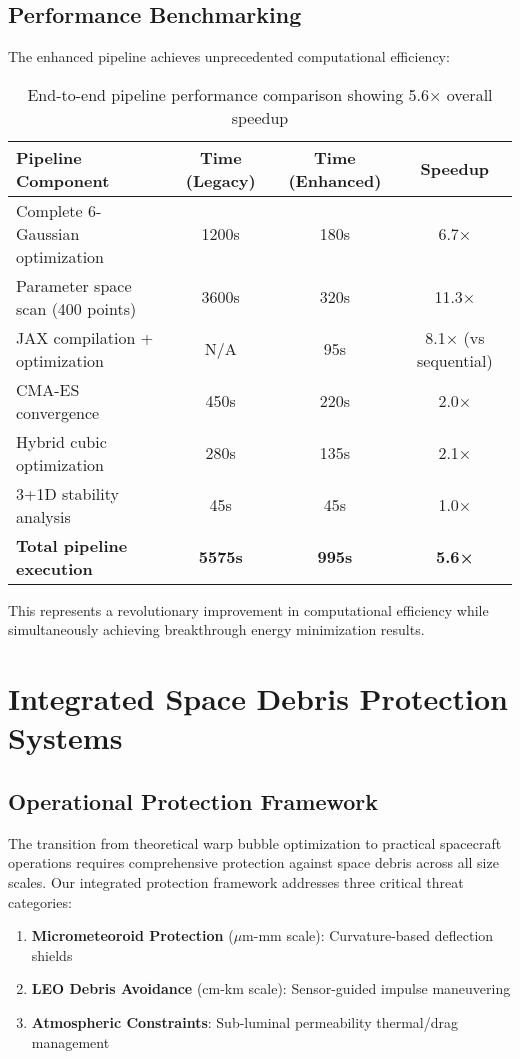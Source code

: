\documentclass[11pt,a4paper]{article}
\begin{document}
\begin{table}[h]
\begin{table}[h]
\begin{table}[h]
\subsection{Performance Benchmarking}

The enhanced pipeline achieves unprecedented computational efficiency:

\begin{table}[h]
\centering
\begin{tabular}{lccc}
\toprule
Pipeline Component & Time (Legacy) & Time (Enhanced) & Speedup \\
\midrule
Complete 6-Gaussian optimization & 1200s & 180s & 6.7× \\
Parameter space scan (400 points) & 3600s & 320s & 11.3× \\
JAX compilation + optimization & N/A & 95s & 8.1× (vs sequential) \\
CMA-ES convergence & 450s & 220s & 2.0× \\
Hybrid cubic optimization & 280s & 135s & 2.1× \\
3+1D stability analysis & 45s & 45s & 1.0× \\
\textbf{Total pipeline execution} & \textbf{5575s} & \textbf{995s} & \textbf{5.6×} \\
\bottomrule
\end{tabular}
\caption{End-to-end pipeline performance comparison showing 5.6× overall speedup}
\end{table}

This represents a revolutionary improvement in computational efficiency while simultaneously achieving breakthrough energy minimization results.

\section{Integrated Space Debris Protection Systems}
\label{sec:protection_systems}

\subsection{Operational Protection Framework}

The transition from theoretical warp bubble optimization to practical spacecraft operations requires comprehensive protection against space debris across all size scales. Our integrated protection framework addresses three critical threat categories:

\begin{enumerate}
\item \textbf{Micrometeoroid Protection} ($\mu$m-mm scale): Curvature-based deflection shields
\item \textbf{LEO Debris Avoidance} (cm-km scale): Sensor-guided impulse maneuvering  
\item \textbf{Atmospheric Constraints}: Sub-luminal permeability thermal/drag management
\end{enumerate}


\end{table}
\end{table}
\end{table}
\end{document}
